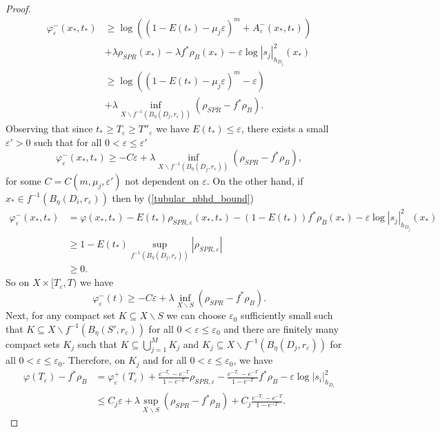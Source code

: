 \documentclass[12pt]{article}
\numberwithin{equation}{section}
\newcommand{\e}{\varepsilon}
\begin{document}
\begin{proof}
\begin{align*}
    \varphi^{-}_{\e}(x_*,t_*) &\geq \log\left((1-E(t_*)-\mu_j \e)^m + A_{\e}^{-}(x_*,t_*)\right)\\
    &+ \lambda \rho_{SPR}(x_*) - \lambda f^*\rho_{B}(x_*) - \e \log |s_j|^2_{h_{D_j}}(x_*) \\
    &\geq \log \left((1-E(t_*) - \mu_j \e)^m - \e\right)\\
    &+ \lambda \inf_{X\backslash f^{-1}(B_{\eta}(D_j,r_\e))} (\rho_{SPR} - f^*\rho_B).
\end{align*}
Observing that since $t_* \geq T_\e \geq T''_\e$ we have $E(t_*) \leq \e$, there exists a small $\e' > 0$ such that for all $0 < \e \leq \e'$ 
\begin{equation*}
    \varphi^{-}_{\e}(x_*,t_*) \geq -C \e + \lambda \inf_{X \backslash f^{-1}(B_{\eta}(D_j,r_{\e}))
    } (\rho_{SPR} - f^*\rho_B),
\end{equation*}
for some $C = C(m,\mu_j, \e')$ not dependent on $\e$. On the other hand, if $x_* \in f^{-1}(B_{\eta}(D_i,r_{\e}))$ then by (\ref{tubular_nbhd_bound})
\begin{align*}
    \varphi_{\e}^{-}(x_*,t_*) &= \varphi(x_*,t_*) - E(t_*) \rho_{SPR,\e}(x_*,t_*) - (1-E(t_*)) f^*\rho_{B}(x_*) - \e \log|s_j|_{h_{D_j}}^2(x_*)\\
    &\geq 1-E(t_*) \sup_{f^{-1}(B_{\eta}(D_j,r_\e))} |\rho_{SPR,\e}|\\
    &\geq 0.
\end{align*}
So on $X \times [T_\e,T)$ we have
\begin{equation*}
    \varphi_{\e}^{-}(t) \geq -C\e + \lambda  \inf_{X\backslash S} (\rho_{SPR} - f^*\rho_B).
\end{equation*}
Next, for any compact set $K \subseteq X \backslash S$ we can choose $\e_0$ sufficiently small such that $K \subseteq X \backslash f^{-1}(B_{\eta}(S',r_\e))$ for all $0 < \e \leq \e_0$ and there are finitely many compact sets $K_j$ such that  $K \subseteq \bigcup_{j=1}^M K_j$ and $K_j \subseteq X \backslash f^{-1}(B_{\eta}(D_j, r_{\e}))$ for all $0 < \e \leq \e_0$. Therefore, on $K_j$ and for all $0 < \e \leq \e_0$,  we have
\begin{align*}
    \varphi(T_\e) - f^*\rho_B &= \varphi_{\e}^{+}(T_\e) + \frac{e^{-T_\e}-e^{-T}}{1-e^{-T}}\rho_{SPR,\e} - \frac{e^{-T_\e}-e^{-T}}{1-e^{-T}} f^*\rho_B - \e \log |s_i|_{h_{D_i}}^2\\
    &\leq C_j \e + \lambda \sup_{X \backslash S} (\rho_{SPR}-f^*\rho_B)+ C_j\frac{e^{-T_\e}-e^{-T}}{1-e^{-T}}.
\end{align*}

\end{proof}
\end{document}
